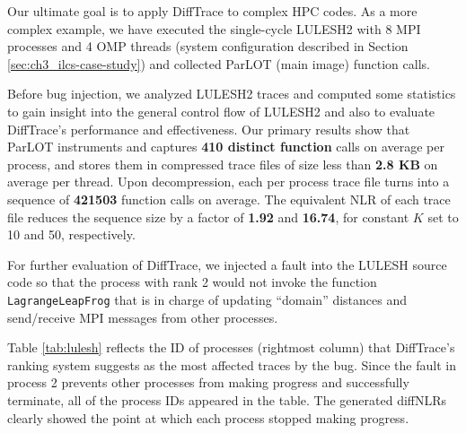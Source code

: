 

Our ultimate goal is to apply DiffTrace to complex HPC codes.
%
As a more complex example, we have executed the single-cycle LULESH2\cite{LULESH2:changes} with 8 MPI processes
and 4 OMP threads (system configuration described in Section \ref{sec:ch3_ilcs-case-study})
and collected ParLOT (main image) function calls.


Before bug injection, we analyzed LULESH2 traces and computed some statistics to gain insight into the
general control flow of LULESH2 and also to evaluate DiffTrace's
performance and effectiveness.
%
Our primary results show that ParLOT instruments and captures \textbf{410 distinct function} calls on
average per process, and stores them in compressed trace files of size less than \textbf{2.8 KB}
on average per thread.
%
Upon decompression, each per process trace file
turns into a sequence of \textbf{421503} function calls on average. The equivalent NLR of each trace file reduces the sequence size by a factor of \textbf{1.92} and \textbf{16.74}, for constant $K$ set to 10 and 50, respectively.
%
%
%
%
%


For further evaluation of DiffTrace, we injected a fault into the LULESH source code so that the process with rank 2
would not invoke the function \texttt{LagrangeLeapFrog} that is in charge of updating ``domain'' distances and send/receive
MPI messages from other processes.
%

%
Table \ref{tab:lulesh} reflects the ID of processes (rightmost column)
that DiffTrace's ranking system suggests as the most affected traces by the bug.
%
Since the fault in process 2 prevents other processes from making progress and successfully terminate,
all of the process IDs appeared in the table.
The generated diffNLRs clearly showed the point at which each process stopped making progress.
